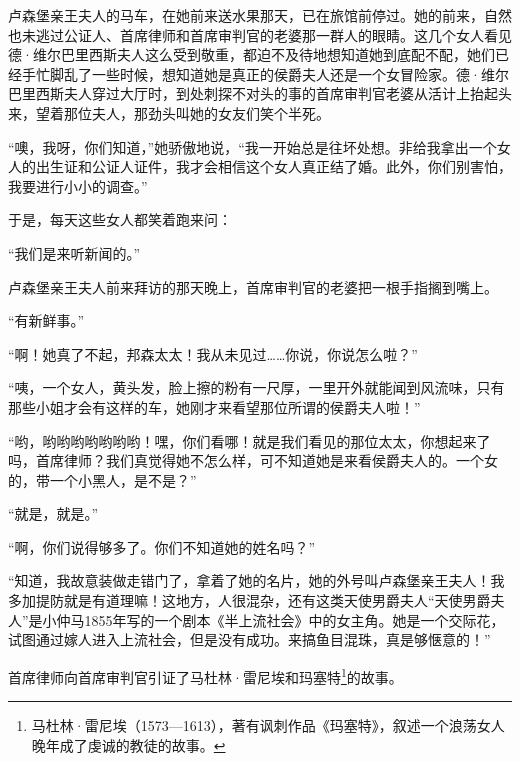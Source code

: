 \par 卢森堡亲王夫人的马车，在她前来送水果那天，已在旅馆前停过。她的前来，自然也未逃过公证人、首席律师和首席审判官的老婆那一群人的眼睛。这几个女人看见德·维尔巴里西斯夫人这么受到敬重，都迫不及待地想知道她到底配不配，她们已经手忙脚乱了一些时候，想知道她是真正的侯爵夫人还是一个女冒险家。德·维尔巴里西斯夫人穿过大厅时，到处刺探不对头的事的首席审判官老婆从活计上抬起头来，望着那位夫人，那劲头叫她的女友们笑个半死。
\par “噢，我呀，你们知道，”她骄傲地说，“我一开始总是往坏处想。非给我拿出一个女人的出生证和公证人证件，我才会相信这个女人真正结了婚。此外，你们别害怕，我要进行小小的调查。”
\par 于是，每天这些女人都笑着跑来问：
\par “我们是来听新闻的。”
\par 卢森堡亲王夫人前来拜访的那天晚上，首席审判官的老婆把一根手指搁到嘴上。
\par “有新鲜事。”
\par “啊！她真了不起，邦森太太！我从未见过……你说，你说怎么啦？”
\par “咦，一个女人，黄头发，脸上擦的粉有一尺厚，一里开外就能闻到风流味，只有那些小姐才会有这样的车，她刚才来看望那位所谓的侯爵夫人啦！”
\par “哟，哟哟哟哟哟哟哟！嘿，你们看哪！就是我们看见的那位太太，你想起来了吗，首席律师？我们真觉得她不怎么样，可不知道她是来看侯爵夫人的。一个女的，带一个小黑人，是不是？”
\par “就是，就是。”
\par “啊，你们说得够多了。你们不知道她的姓名吗？”
\par “知道，我故意装做走错门了，拿着了她的名片，她的外号叫卢森堡亲王夫人！我多加提防就是有道理嘛！这地方，人很混杂，还有这类天使男爵夫人“天使男爵夫人”是小仲马1855年写的一个剧本《半上流社会》中的女主角。她是一个交际花，试图通过嫁人进入上流社会，但是没有成功。来搞鱼目混珠，真是够惬意的！”
\par 首席律师向首席审判官引证了马杜林·雷尼埃和玛塞特\footnote{马杜林·雷尼埃（1573—1613），著有讽刺作品《玛塞特》，叙述一个浪荡女人晚年成了虔诚的教徒的故事。}的故事。
